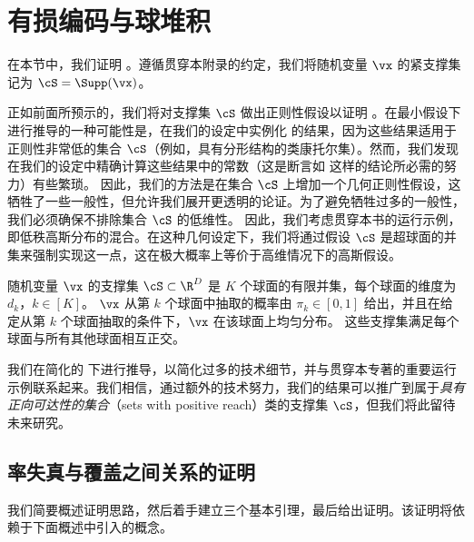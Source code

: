 \documentclass[../../book-main_zh.tex]{subfiles}
\begin{document}
\section{有损编码与球堆积}\label{app:rate-distortion-covering}

在本节中，我们证明 。遵循贯穿本附录的约定，我们将随机变量 $\vx$ 的紧支撑集记为 $\cS = \Supp(\vx)$。

正如前面所预示的，我们将对支撑集 $\cS$ 做出正则性假设以证明 。在最小假设下进行推导的一种可能性是，在我们的设定中实例化 \cite{Riegler2018-jh,Riegler2023-rr} 的结果，因为这些结果适用于正则性非常低的集合 $\cS$（例如，具有分形结构的类康托尔集）。然而，我们发现在我们的设定中精确计算这些结果中的常数（这是断言如  这样的结论所必需的努力）有些繁琐。
因此，我们的方法是在集合 $\cS$ 上增加一个几何正则性假设，这牺牲了一些一般性，但允许我们展开更透明的论证。为了避免牺牲过多的一般性，我们必须确保不排除集合 $\cS$ 的低维性。
因此，我们考虑贯穿本书的运行示例，即低秩高斯分布的混合。在这种几何设定下，我们将通过假设 $\cS$ 是超球面的并集来强制实现这一点，这在极大概率上等价于高维情况下的高斯假设。

\begin{assumption}\label{assumption:union-of-spheres}
    随机变量 $\vx$ 的支撑集 $\cS \subset \R^D$ 是 $K$ 个球面的有限并集，每个球面的维度为 $d_k$，$k \in [K]$。
    $\vx$ 从第 $k$ 个球面中抽取的概率由 $\pi_k \in [0, 1]$ 给出，并且在给定从第 $k$ 个球面抽取的条件下，$\vx$ 在该球面上均匀分布。
    这些支撑集满足每个球面与所有其他球面相互正交。
\end{assumption}

我们在简化的  下进行推导，以简化过多的技术细节，并与贯穿本专著的重要运行示例联系起来。我们相信，通过额外的技术努力，我们的结果可以推广到属于\textit{具有正向可达性的集合}（sets with positive reach）类的支撑集 $\cS$，但我们将此留待未来研究。

\subsection{率失真与覆盖之间关系的证明}

我们简要概述证明思路，然后着手建立三个基本引理，最后给出证明。该证明将依赖于下面概述中引入的概念。
\end{document}
